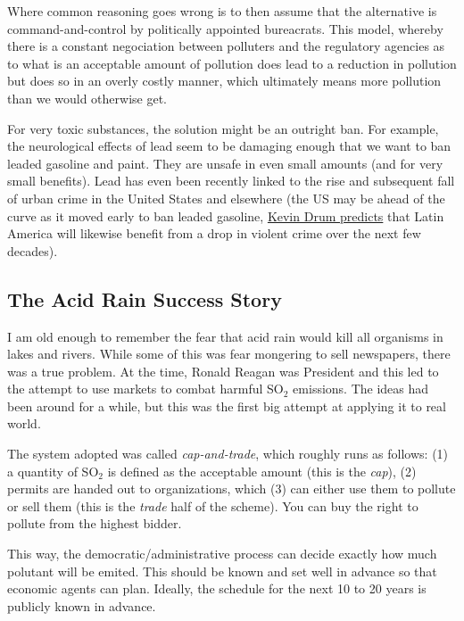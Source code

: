 Where common reasoning goes wrong is to then assume that the alternative is
command-and-control by politically appointed bureacrats. This model, whereby
there is a constant negociation between polluters and the regulatory agencies
as to what is an acceptable amount of pollution does lead to a reduction in
pollution but does so in an overly costly manner, which ultimately means more
pollution than we would otherwise get.

For very toxic substances, the solution might be an outright ban. For example,
the neurological effects of lead seem to be damaging enough that we want to ban
leaded gasoline and paint. They are unsafe in even small amounts (and for very
small benefits). Lead has even been recently linked to the rise and subsequent
fall of urban crime in the United States and elsewhere (the US may be ahead of
the curve as it moved early to ban leaded gasoline,
\href{http://www.motherjones.com/kevin-drum/2013/01/lead-and-crime-ill-be-melissa-harris-perry-show-sunday-10-am}{Kevin
Drum predicts} that Latin America will likewise benefit from a drop in violent
crime over the next few decades).

\subsection{The Acid Rain Success Story}

I am old enough to remember the fear that acid rain would kill all organisms in
lakes and rivers. While some of this was fear mongering to sell newspapers,
there was a true problem. At the time, Ronald Reagan was President and this led
to the attempt to use markets to combat harmful SO${}_2$ emissions. The ideas
had been around for a while, but this was the first big attempt at applying it
to real world.

The system adopted was called \emph{cap-and-trade}, which roughly runs as
follows: (1) a quantity of SO${}_2$ is defined as the acceptable amount (this
is the \emph{cap}), (2) permits are handed out to organizations, which (3) can
either use them to pollute or sell them (this is the \emph{trade} half of the
scheme). You can buy the right to pollute from the highest bidder.

This way, the democratic/administrative process can decide exactly how much
polutant will be emited. This should be known and set well in advance so that
economic agents can plan. Ideally, the schedule for the next 10 to 20 years
is publicly known in advance.

